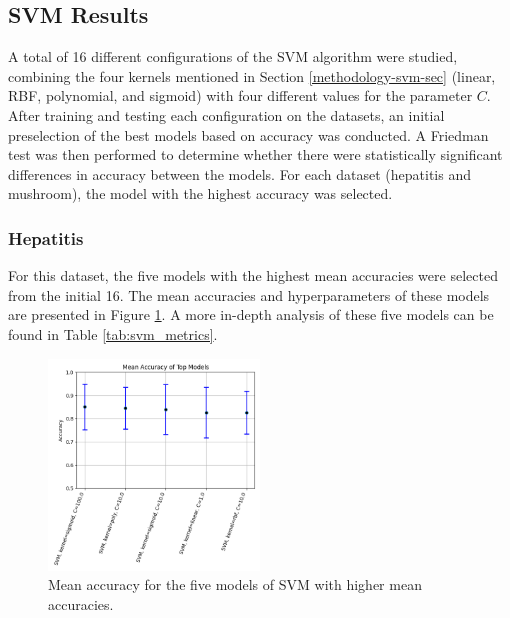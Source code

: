 \subsection{SVM Results} A total of 16 different configurations of the SVM algorithm were studied, combining the four kernels mentioned in Section \ref{methodology-svm-sec} (linear, RBF, polynomial, and sigmoid) with four different values for the parameter $C$. After training and testing each configuration on the datasets, an initial preselection of the best models based on accuracy was conducted. A Friedman test was then performed to determine whether there were statistically significant differences in accuracy between the models. For each dataset (hepatitis and mushroom), the model with the highest accuracy was selected.

\subsubsection{Hepatitis} For this dataset, the five models with the highest mean accuracies were selected from the initial 16. The mean accuracies and hyperparameters of these models are presented in Figure \ref{fig:hep-svm-1}. A more in-depth analysis of these five models can be found in Table \ref{tab:svm_metrics}.

\begin{figure}[Ht]
    \centering
    \includegraphics[width=0.5\textwidth]{figures/svm/hepatitis/statistical_analysis_results.png}
    \caption{Mean accuracy for the five models of SVM with higher mean accuracies.}
    \label{fig:hep-svm-1}
\end{figure}


